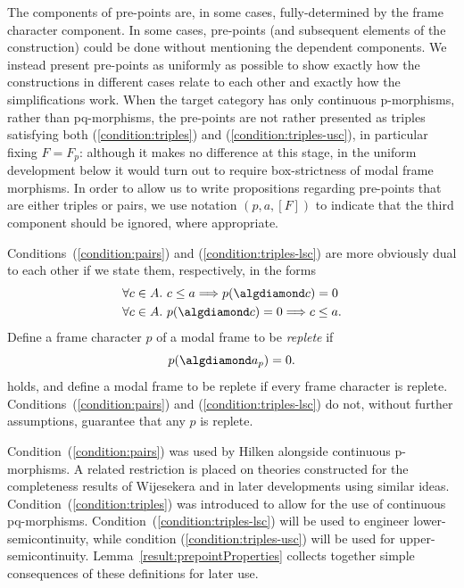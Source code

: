 \documentclass{article}[a4paper]
\theoremstyle{definition}
\begin{document}
The components of pre-points are, in some cases, fully-determined by the frame character component. In some cases, pre-points (and subsequent elements of the construction) could be done without mentioning the dependent components. We instead present pre-points as uniformly as possible to show exactly how the constructions in different cases relate to each other and exactly how the simplifications work. When the target category has only continuous p-morphisms, rather than pq-morphisms, the pre-points are not rather presented as triples satisfying both (\ref{condition:triples}) and (\ref{condition:triples-usc}), in particular fixing $F=F_p$: although it makes no difference at this stage, in the uniform development below it would turn out to require box-strictness of modal frame morphisms.
In order to allow us to write propositions regarding pre-points that are either triples or pairs, we use notation $(p,a,[F])$ to indicate that the third component should be ignored, where appropriate.

Conditions~(\ref{condition:pairs}) and (\ref{condition:triples-lsc}) are more obviously dual to each other if we state them, respectively, in the forms 
\begin{align*}
    \forall c \in A . \ & c \leq a \Longrightarrow p(\algdiamond c) = 0\\
    \forall c \in A . \ & p(\algdiamond c) = 0 \Longrightarrow c \leq a . \\
\end{align*}
Define a frame character $p$ of a modal frame to be \emph{replete} if 
\begin{equation*}
    p( \algdiamond a_p) = 0 . 
\end{equation*}
holds, and define a modal frame to be replete if every frame character is replete.
Conditions~(\ref{condition:pairs}) and (\ref{condition:triples-lsc}) do not, without further assumptions, guarantee that any  $p$ is replete.

Condition~(\ref{condition:pairs}) was used by Hilken \cite{hil00} alongside continuous p-morphisms. A related restriction is placed on theories constructed for the completeness results of Wijesekera \cite{wijesekera1990constructive} 
and in later developments \cite{AMPR01,FM97PLL,MendlerPaiva2005} using similar ideas. Condition~(\ref{condition:triples}) was introduced to allow for the use of continuous pq-morphisms. Condition~(\ref{condition:triples-lsc}) will be used to engineer lower-semicontinuity, while condition (\ref{condition:triples-usc}) will be used for upper-semicontinuity. 
Lemma~\ref{result:prepointProperties}  collects together simple consequences of these definitions for later use. 
\end{document}
